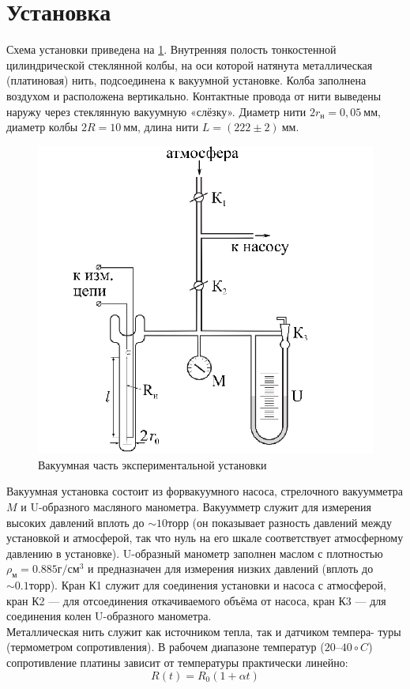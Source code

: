 \documentclass[12pt]{article}
\begin{document}
    \section{Установка}
        Схема установки приведена на \ref{vacuum_part}. Внутренняя полость тонкостенной
        цилиндрической стеклянной колбы, на оси которой натянута металлическая
        (платиновая) нить, подсоединена к вакуумной установке. Колба заполнена
        воздухом и расположена вертикально. Контактные провода от нити выведены
        наружу через стеклянную вакуумную «слёзку».
        Диаметр нити $2r_{\text{н}} = 0,05~\text{мм}$, диаметр колбы $2R = 10~\text{мм}$,
        длина нити $L = (222\pm 2)~\text{мм}$.
        \begin{figure}[H]
            \centering
            \includegraphics[width=0.4\linewidth]{vacuum.png}
            \caption{Вакуумная часть экспериментальной установки}
            \label{vacuum_part}
        \end{figure}
        Вакуумная установка состоит из форвакуумного насоса, стрелочного вакуумметра $M$ и U-образного масляного манометра. Вакуумметр служит для
        измерения высоких давлений вплоть до $\sim 10 \text{торр}$ (он показывает разность
        давлений между установкой и атмосферой, так что нуль на его шкале соответствует атмосферному давлению в установке). U-образный манометр
        заполнен маслом с плотностью $\rho_{\text{м}} = 0.885 \text{г}/\text{см}^3$ и предназначен для измерения
        низких давлений (вплоть до $\sim 0.1 \text{торр}$). Кран К1 служит для соединения установки и насоса с атмосферой, кран К2 — для отсоединения откачиваемого
        объёма от насоса, кран К3 — для соединения колен U-образного манометра.\\
        Металлическая нить служит как источником тепла, так и датчиком темпера-
        туры (термометром сопротивления). В рабочем диапазоне температур ($20–40 \circ C$)
        сопротивление платины зависит от температуры практически линейно:
        \begin{equation}\label{sopr}
            R(t) = R_0(1+\alpha t)
        \end{equation}
\end{document}
